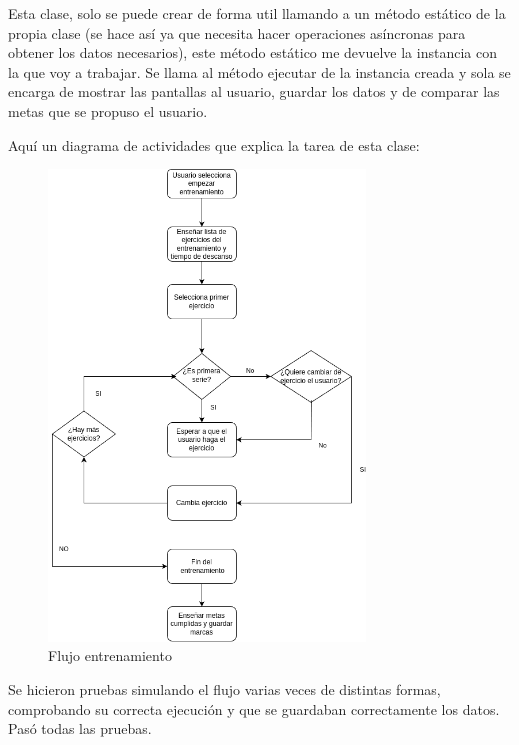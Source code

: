 Esta clase, solo se puede crear de forma util llamando a un método estático de la propia clase (se hace así ya que necesita hacer operaciones asíncronas para obtener los datos necesarios), este método estático me devuelve la instancia con la que voy a trabajar. Se llama al método ejecutar de la instancia creada y sola se encarga de mostrar las pantallas al usuario, guardar los datos y de comparar las metas que se propuso el usuario.

Aquí un diagrama de actividades que explica la tarea de esta clase:

\begin{figure}[H]
    \centering
    \includegraphics[width=0.75\textwidth]{tablas/FlujoEntrenamiento.png}
    \caption{Flujo entrenamiento}
    \label{fig:Flujo entrenamiento}
\end{figure}

Se hicieron pruebas simulando el flujo varias veces de distintas formas, comprobando su correcta ejecución y que se guardaban correctamente los datos. Pasó todas las pruebas.


